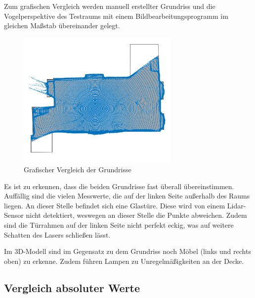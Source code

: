 Zum grafischen Vergleich werden manuell erstellter Grundriss und die Vogelperspektive des Testraums mit einem Bildbearbeitungsprogramm im gleichen Maßstab übereinander gelegt.

\begin{figure}[H]
	\centering
	\includegraphics[width=0.7\textwidth]{images/Validierung/uebereinander}
	\caption{Grafischer Vergleich der Grundrisse}
	\label{uebereinander}
\end{figure}


Es ist zu erkennen, dass die beiden Grundrisse fast überall übereinstimmen. Auffällig sind die vielen Messwerte, die auf der linken Seite außerhalb des Raums liegen. An dieser Stelle befindet sich eine Glastüre. Diese wird von einem Lidar-Sensor nicht detektiert, weswegen an dieser Stelle die Punkte abweichen. Zudem sind die Türrahmen auf der linken Seite nicht perfekt eckig, was auf weitere Schatten des Lasers schließen lässt.

Im 3D-Modell sind im Gegensatz zu dem Grundriss noch Möbel (links und rechts oben) zu erkenne. Zudem führen Lampen zu Unregelmäßigkeiten an der Decke.


\subsection{Vergleich absoluter Werte}

